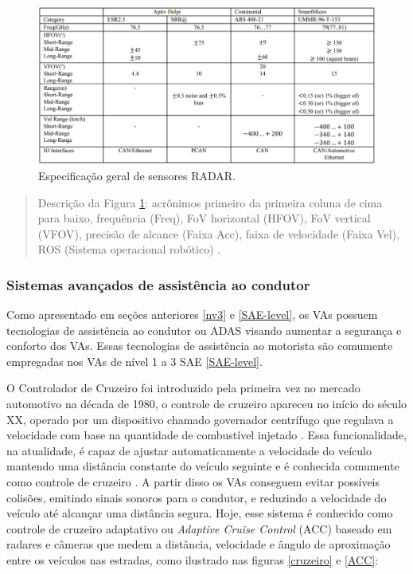 \begin{figure}[H]
\centering
\includegraphics[width=\textwidth]{Figures/radar-table.png}
\caption{Especificação geral de sensores RADAR.}
\label{tabela-radar}
\end{figure}

\begin{quote}
Descrição da Figura \ref{tabela-radar}: acrônimos primeiro da primeira coluna de cima para baixo, frequência (Freq), FoV horizontal (HFOV), FoV vertical (VFOV), precisão de alcance (Faixa Acc), faixa de velocidade (Faixa Vel), ROS (Sistema operacional robótico) \cite{sensors}.
\end{quote}


\subsubsection{Sistemas avançados de assistência ao condutor} \label{adas}


Como apresentado em seções anteriores \ref{nv3} e \ref{SAE-level}, os VAs possuem tecnologias de assistência ao condutor ou ADAS visando aumentar a segurança e conforto dos VAs. Essas tecnologias de assistência ao motorista são comumente empregadas nos VAs de nível 1 a 3 SAE \ref{SAE-level}.

 \label{cruzeiroo}

O Controlador de Cruzeiro foi introduzido pela primeira vez no mercado automotivo na década de 1980, o controle de cruzeiro apareceu no início do século XX, operado por um dispositivo chamado governador centrífugo que regulava a velocidade com base na quantidade de combustível injetado \cite{caio}. Essa funcionalidade, na atualidade, é capaz de ajustar automaticamente a velocidade do veículo mantendo uma distância constante do veículo seguinte e é conhecida comumente como controle de cruzeiro \cite{sensors-yet}.
A partir disso os VAs conseguem evitar possíveis colisões, emitindo sinais sonoros para o condutor, e reduzindo a velocidade do veículo até alcançar uma distância segura. Hoje, esse sistema é conhecido como controle de cruzeiro adaptativo ou \textit{Adaptive Cruise Control} (ACC) baseado em radares e câmeras que medem a distância, velocidade e ângulo de aproximação entre os veículos nas estradas, como ilustrado nas figuras \ref{cruzeiro} e \ref{ACC}:

